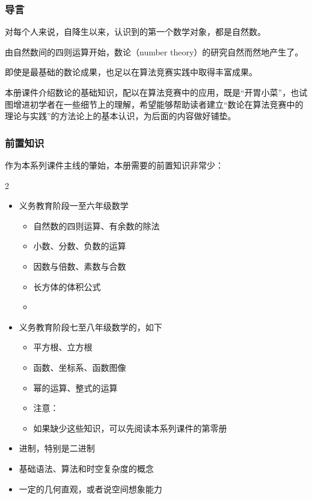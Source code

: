 
\begin{frame}
  \frametitle{导言}
  对每个人来说，自降生以来，认识到的第一个数学对象，都是自然数。
  \pause
  
  由自然数间的四则运算开始，数论（number theory）的研究自然而然地产生了。
  \pause
  
  \emptyline
  即使是最基础的数论成果，也足以在算法竞赛实践中取得丰富成果。
  \pause
  
  \emptyline
  本册课件介绍数论的基础知识，配以在算法竞赛中的应用，既是“开胃小菜”，也试图增进初学者在一些细节上的理解，希望能够帮助读者建立“数论在算法竞赛中的理论与实践”的方法论上的基本认识，为后面的内容做好铺垫。
\end{frame}
\begin{frame}
  \frametitle{前置知识}
  作为本系列课件主线的肇始，本册需要的前置知识非常少：
  \begin{mymulticols}[l][l]{2}
    \begin{itemize}
      \item 义务教育阶段一至六年级数学
      \begin{itemize}
        \item 自然数的四则运算、有余数的除法
        \item 小数、分数、负数的运算
        \item 因数与倍数、素数与合数
        \item 长方体的体积公式
        \item {}
      \end{itemize}
      \item 义务教育阶段七至八年级数学的，如下
      \begin{itemize}
        \item 平方根、立方根
        \item 函数、坐标系、函数图像
        \item 幂的运算、整式的运算
        \item 注意：
        \item \alert{如果缺少这些知识，可以先阅读本系列课件的第零册}
      \end{itemize}
    \end{itemize}
  \end{mymulticols}
  \begin{itemize}
    \item 进制，特别是二进制
    \item \Cpp{} 基础语法、算法和时空复杂度的概念
    \item 一定的几何直观，或者说空间想象能力
  \end{itemize}
\end{frame}
